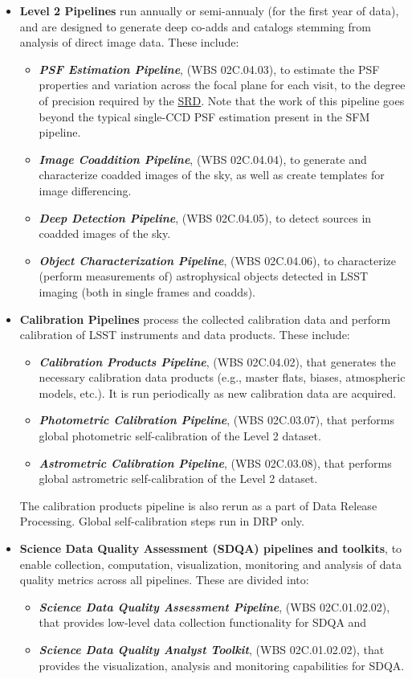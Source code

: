 \documentclass[12pt]{article}
\newcommand{\ds}[2]{{\color{blue} \href{https://docushare.lsstcorp.org/docushare/dsweb/Get/#1}{#2}}\xspace}
\newcommand{\SRD}{\ds{LPM-17}{SRD}}
\newcommand{\wbsSDQAP}{WBS 02C.01.02.02}
\newcommand{\wbsSDQAT}{WBS 02C.01.02.02}
\newcommand{\wbsPSF}{WBS 02C.04.03}
\newcommand{\wbsCoadd}{WBS 02C.04.04}
\newcommand{\wbsDeepDet}{WBS 02C.04.05}
\newcommand{\wbsObjChar}{WBS 02C.04.06}
\newcommand{\wbsCPP}{WBS 02C.04.02}
\newcommand{\wbsPhotoCal}{WBS 02C.03.07}
\newcommand{\wbsAstroCal}{WBS 02C.03.08}
\begin{document}
\begin{itemize}
    \item {\bf Level 2 Pipelines} run annually or semi-annualy (for the first year of data), and are designed to generate deep co-adds and catalogs stemming from analysis of direct image data.  These include:
    \begin{itemize}
        \item {\bf \em PSF Estimation Pipeline}, (\wbsPSF), to estimate the PSF properties and variation across the focal plane for each visit, to the degree of precision required by the \SRD. Note that the work of this pipeline goes beyond the typical single-CCD PSF estimation present in the SFM pipeline.
        \item {\bf \em Image Coaddition Pipeline}, (\wbsCoadd), to generate and characterize coadded images of the sky, as well as create templates for image differencing.
        \item {\bf \em Deep Detection Pipeline}, (\wbsDeepDet), to detect sources in coadded images of the sky.
        \item {\bf \em Object Characterization Pipeline}, (\wbsObjChar), to characterize (perform measurements of) astrophysical objects detected in LSST imaging (both in single frames and coadds).
    \end{itemize}
    
    \item {\bf Calibration Pipelines} process the collected calibration data and perform calibration of LSST instruments and data products. These include:
    \begin{itemize}
        \item {\bf \em Calibration Products Pipeline}, (\wbsCPP), that generates the necessary calibration data products (e.g., master flats, biases, atmospheric models, etc.). It is run periodically as new calibration data are acquired.
        \item {\bf \em Photometric Calibration Pipeline}, (\wbsPhotoCal), that performs global photometric self-calibration of the Level 2 dataset.
        \item {\bf \em Astrometric Calibration Pipeline}, (\wbsAstroCal), that performs global astrometric self-calibration of the Level 2 dataset.
    \end{itemize}
    The calibration products pipeline is also rerun as a part of Data Release Processing. Global self-calibration steps run in DRP only.

       \item {\bf Science Data Quality Assessment (SDQA) pipelines and toolkits}, to enable collection, computation, visualization, monitoring and analysis of data quality metrics across all pipelines. These are divided into:
       \begin{itemize}
           \item {\bf \em Science Data Quality Assessment Pipeline}, (\wbsSDQAP), that provides low-level data collection functionality for SDQA and
           \item {\bf \em Science Data Quality Analyst Toolkit}, (\wbsSDQAT), that provides the visualization, analysis and monitoring capabilities for SDQA.
       \end{itemize}


\end{itemize}
\end{document}
